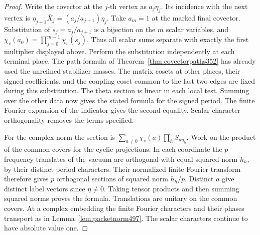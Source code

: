 \documentclass[a4paper,11pt]{article}
\theoremstyle{definition}
\theoremstyle{remark}
\numberwithin{equation}{section}
\begin{document}
\begin{proof}
Write the covector at the \(j\)-th vertex as \(a_j\eta_j\).
Its incidence with the next vertex is
\(\eta_{j+1}\bar X_j=(a_j/a_{j+1})\eta_j\).
Take \(a_m=1\) at the marked final covector. Substitution of
\(s_j=a_j/a_{j+1}\) is a bijection on the \(m\) scalar
variables, and \(\chi_v(a_0)=\prod_{j=0}^{m-1}\chi_v(s_j)\).
Thus all scalar sums separate with exactly the first multiplier
displayed above. Perform the substitution independently at
each terminal place. The path formula of
Theorem~\ref{thm:covectorpaths352} has already used the
unrefined stabilizer masses. The matrix cosets at other
places, their signed coefficients, and the coupling coset
common to the last two edges are fixed during this substitution.
The theta section is linear in each local test. Summing over
the other data now gives the stated formula for the signed
period. The finite Fourier expansion of the indicator gives
the second equality. Scalar character orthogonality removes
the terms specified.

For the complex norm the section is
\(\sum_{a\ne0}\chi_v(a)\prod_h S_{a\eta_h}\). Work on the
product of the common covers for the cyclic projections.
In each coordinate the \(p\) frequency translates of the
vacuum are orthogonal with equal squared norm \(h_h\), by
their distinct period characters. Their normalized finite
Fourier transform therefore gives \(p\) orthogonal sections
of squared norm \(h_h/p\). Distinct \(a\) give distinct
label vectors since \(\eta\ne0\). Taking tensor products and
then summing squared norms proves the formula. Translations
are unitary on the common covers. At a complex embedding the
finite Fourier characters and their phases transport as in
Lemma~\ref{lem:packetnorm497}. The scalar characters continue
to have absolute value one.
\end{proof}
\end{document}
